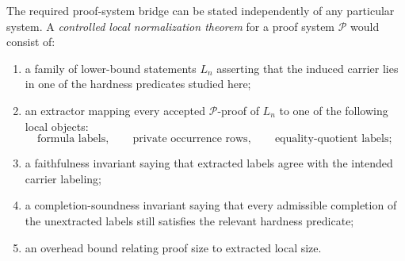 \documentclass[11pt]{article}
\theoremstyle{definition}
\begin{document}
The required proof-system bridge can be stated independently of any particular system.  A \emph{controlled local normalization theorem} for a proof system \(\mathcal P\) would consist of:
\begin{enumerate}
  \item a family of lower-bound statements \(L_n\) asserting that the induced carrier lies in one of the hardness predicates studied here;
  \item an extractor mapping every accepted \(\mathcal P\)-proof of \(L_n\) to one of the following local objects:
  \[
    \text{formula labels},\qquad
    \text{private occurrence rows},\qquad
    \text{equality-quotient labels};
  \]
  \item a faithfulness invariant saying that extracted labels agree with the intended carrier labeling;
  \item a completion-soundness invariant saying that every admissible completion of the unextracted labels still satisfies the relevant hardness predicate;
  \item an overhead bound relating proof size to extracted local size.
\end{enumerate}
\end{document}
